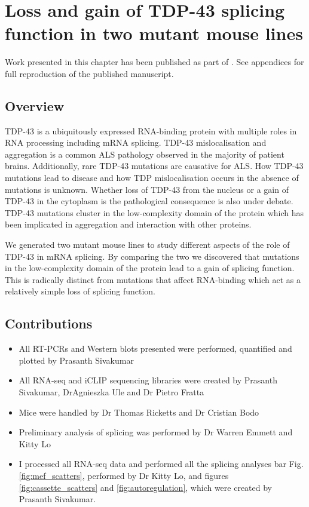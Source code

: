 \chapter{Loss and gain of TDP-43 splicing function in two mutant mouse lines}
\label{chapter:tdp_mice}

Work presented in this chapter has been published as part of \citep{Fratta2018}. See appendices for full reproduction of the published manuscript.

\section{Overview}

TDP-43 is a ubiquitously expressed RNA-binding protein with multiple roles in RNA processing including mRNA splicing.
TDP-43 mislocalisation and aggregation is a common ALS pathology observed in the majority of patient brains.
Additionally, rare  TDP-43 mutations are causative for ALS. 
How TDP-43 mutations lead to disease and how TDP mislocalisation occurs in the absence of mutations is unknown. 
Whether loss of TDP-43 from the nucleus or a gain of TDP-43 in the cytoplasm is the pathological consequence is also under debate.
TDP-43 mutations cluster in the low-complexity domain of the protein which has been implicated in aggregation and interaction with other proteins.

We generated two mutant mouse lines to study different aspects of the role of TDP-43 in mRNA splicing.
By comparing the two we discovered that mutations in the low-complexity domain of the protein lead to a gain of splicing function. 
This is radically distinct from mutations that affect RNA-binding which act as a relatively simple loss of splicing function.


\section{Contributions}
\begin{itemize}
	\item All RT-PCRs and Western blots presented were performed, quantified and plotted by Prasanth Sivakumar
	\item All RNA-seq and iCLIP sequencing libraries were created by Prasanth Sivakumar, DrAgnieszka Ule and Dr Pietro Fratta
	\item Mice were handled by Dr Thomas Ricketts and Dr Cristian Bodo
	\item Preliminary analysis of splicing was performed by Dr Warren Emmett and Kitty Lo
	\item I processed all RNA-seq data and performed all the splicing analyses bar Fig. \ref{fig:mef_scatters}, performed by Dr Kitty Lo, and figures \ref{fig:cassette_scatters} and \ref{fig:autoregulation}, which were created by Prasanth Sivakumar.
\end{itemize}




